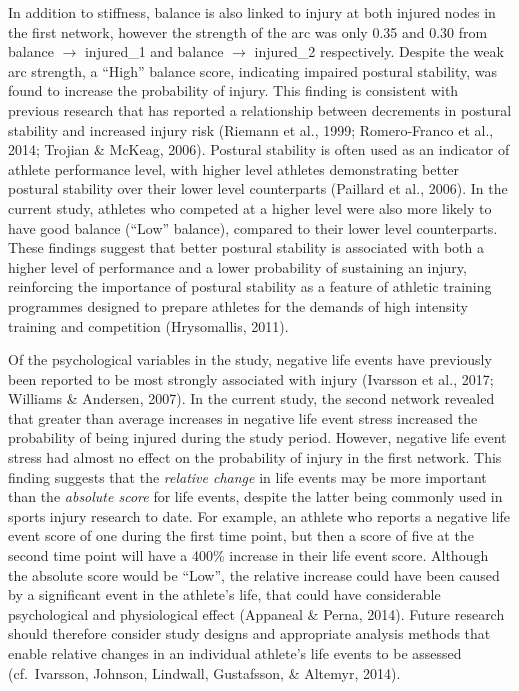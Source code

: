 \documentclass[man,floatsintext]{apa6}
\begin{document}
In addition to stiffness, balance is also linked to injury at both injured nodes in the first network, however the strength of the arc was only 0.35 and 0.30 from balance \(\rightarrow\) injured\_1 and balance \(\rightarrow\) injured\_2 respectively.
Despite the weak arc strength, a \enquote{High} balance score, indicating impaired postural stability, was found to increase the probability of injury.
This finding is consistent with previous research that has reported a relationship between decrements in postural stability and increased injury risk (Riemann et al., 1999; Romero-Franco et al., 2014; Trojian \& McKeag, 2006).
Postural stability is often used as an indicator of athlete performance level, with higher level athletes demonstrating better postural stability over their lower level counterparts (Paillard et al., 2006).
In the current study, athletes who competed at a higher level were also more likely to have good balance (\enquote{Low} balance), compared to their lower level counterparts.
These findings suggest that better postural stability is associated with both a higher level of performance and a lower probability of sustaining an injury, reinforcing the importance of postural stability as a feature of athletic training programmes designed to prepare athletes for the demands of high intensity training and competition (Hrysomallis, 2011).

Of the psychological variables in the study, negative life events have previously been reported to be most strongly associated with injury (Ivarsson et al., 2017; Williams \& Andersen, 2007).
In the current study, the second network revealed that greater than average increases in negative life event stress increased the probability of being injured during the study period.
However, negative life event stress had almost no effect on the probability of injury in the first network.
This finding suggests that the \emph{relative change} in life events may be more important than the \emph{absolute score} for life events, despite the latter being commonly used in sports injury research to date.
For example, an athlete who reports a negative life event score of one during the first time point, but then a score of five at the second time point will have a 400\% increase in their life event score.
Although the absolute score would be \enquote{Low}, the relative increase could have been caused by a significant event in the athlete's life, that could have considerable psychological and physiological effect (Appaneal \& Perna, 2014).
Future research should therefore consider study designs and appropriate analysis methods that enable relative changes in an individual athlete's life events to be assessed (cf.~Ivarsson, Johnson, Lindwall, Gustafsson, \& Altemyr, 2014).
\end{document}

